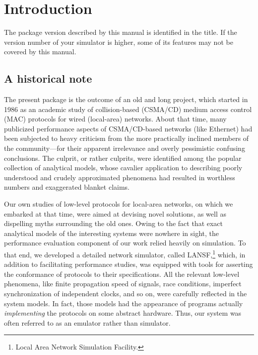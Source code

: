 
\section{Introduction}
\label{rm_in}

The package version described by this manual is identified in the title.
If the version number of your simulator is higher, some of its features may
not be covered by this manual.

\subsection{A historical note}
\label{rm_in_hi}

The present package is the outcome of an old and long project, which started in
1986 as an academic study of collision-based (CSMA/CD) medium access control
(MAC) protocols for wired (local-area) networks.
About that time, many publicized performance aspects of CSMA/CD-based networks
(like Ethernet) had been subjected to heavy criticism from the more
practically inclined members of the community---for their apparent irrelevance
and overly pessimistic confusing conclusions.
The culprit, or rather culprits, were identified among the popular
collection of analytical models, whose cavalier application to describing
poorly understood and crudely approximated phenomena had resulted in
worthless numbers and exaggerated blanket claims.

Our own studies of low-level protocols for local-area networks, on
which we embarked at that time, were aimed at
devising novel solutions, as well as dispelling myths surrounding
the old ones.
Owing to the fact that exact analytical models of the interesting systems
were nowhere in sight, the performance evaluation component of our work
relied heavily on simulation.
To that end, we developed a detailed network simulator, called
{\sc LANSF},\footnote{Local Area Network Simulation Facility.}
which, in addition
to facilitating performance studies, was equipped with tools for asserting
the conformance of protocols to their specifications.
All the relevant low-level phenomena, like
finite propagation speed of
signals, race conditions, imperfect synchronization
of independent clocks, and so on,
were carefully reflected in the system models.
In fact, those models had the appearance of programs actually
{\em implementing\/} the protocols on some abstract hardware.
Thus, our system was often referred to as an emulator rather than
simulator.

